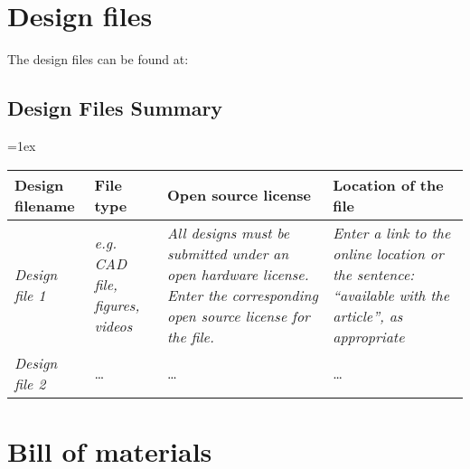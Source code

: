 \documentclass[11pt, letterpaper]{article}
\begin{document}
\section{Design files}

The design files can be found at: 

\subsection{Design Files Summary}


\tabulinesep=1ex
\begin{tabu} to \linewidth {|X|X|X[1.5,1]|X[1.5,1]|}
\hline
\textbf{Design filename} & \textbf{File type} & \textbf{Open source license} & \textbf{Location of the file} \\\hline
\textit{Design file 1} & \textit{e.g. CAD file, figures, videos} & \textit{All designs must be submitted under an open hardware license. Enter the corresponding open source license for the file.} & \textit{Enter a link to the online location or the sentence: ``available with the article'', as appropriate}  \\\hline
\textit{Design file 2} & \dots & \dots & \dots \\\hline

\end{tabu}



\section{Bill of materials}
\end{document}
